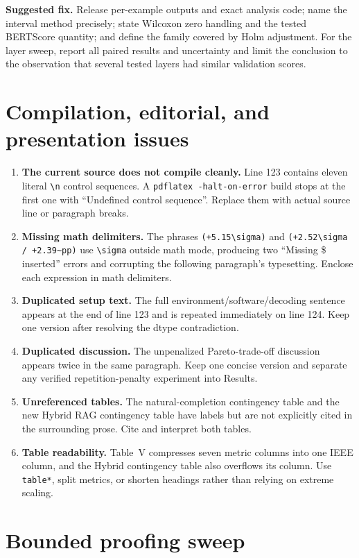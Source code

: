 \documentclass[11pt]{article}
\begin{document}
\textbf{Suggested fix.} Release per-example outputs and exact analysis code; name the interval method precisely; state Wilcoxon zero handling and the tested BERTScore quantity; and define the family covered by Holm adjustment.  For the layer sweep, report all paired results and uncertainty and limit the conclusion to the observation that several tested layers had similar validation scores.

\section*{Compilation, editorial, and presentation issues}

\begin{enumerate}
 \item \textbf{The current source does not compile cleanly.} Line 123 contains eleven literal \verb|\n| control sequences.  A \texttt{pdflatex -halt-on-error} build stops at the first one with ``Undefined control sequence''.  Replace them with actual source line or paragraph breaks.
 \item \textbf{Missing math delimiters.} The phrases \verb|(+5.15\sigma)| and \verb|(+2.52\sigma / +2.39~pp)| use \verb|\sigma| outside math mode, producing two ``Missing \$ inserted'' errors and corrupting the following paragraph's typesetting.  Enclose each expression in math delimiters.
 \item \textbf{Duplicated setup text.} The full environment/software/decoding sentence appears at the end of line 123 and is repeated immediately on line 124.  Keep one version after resolving the dtype contradiction.
 \item \textbf{Duplicated discussion.} The unpenalized Pareto-trade-off discussion appears twice in the same paragraph.  Keep one concise version and separate any verified repetition-penalty experiment into Results.
 \item \textbf{Unreferenced tables.} The natural-completion contingency table and the new Hybrid RAG contingency table have labels but are not explicitly cited in the surrounding prose.  Cite and interpret both tables.
 \item \textbf{Table readability.} Table~V compresses seven metric columns into one IEEE column, and the Hybrid contingency table also overflows its column.  Use \verb|table*|, split metrics, or shorten headings rather than relying on extreme scaling.
\end{enumerate}

\section*{Bounded proofing sweep}
\end{document}
